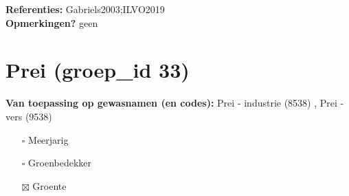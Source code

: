 \documentclass{article}
\begin{document}
  \textbf{Referenties:} Gabriels2003;ILVO2019 \vspace{0.10cm} \\ 
  \textbf{Opmerkingen?} geen \vspace{0.10cm} \\ 
 \newpage 
 \section{Prei (groep\_id 33)} 
 \textbf{Van toepassing op gewasnamen (en codes):} Prei - industrie (8538) , Prei - vers (9538) 
 \begin{multicols}{3} \begin{itemize} \item[$\square$] Meerjarig \item[$\square$] Groenbedekker \item[$\boxtimes$] Groente \end{itemize} \end{multicols} 
\end{document}
